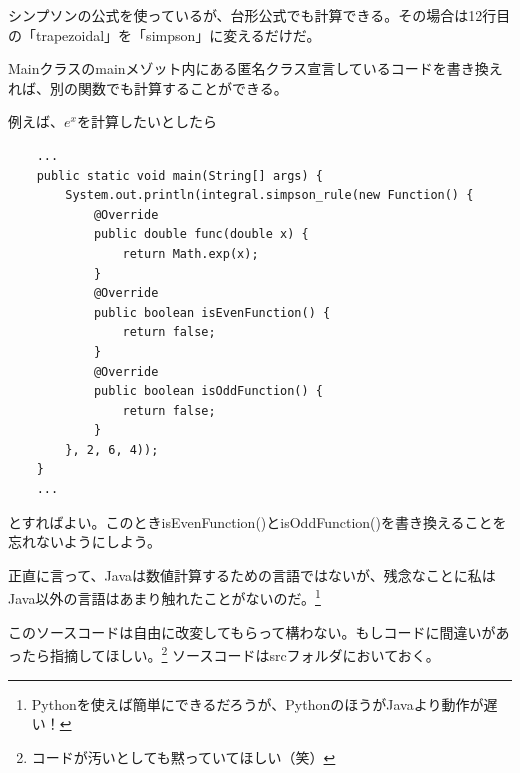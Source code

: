 \documentclass[a4j,dvipdfmx]{jsarticle}
\begin{document}
シンプソンの公式を使っているが、台形公式でも計算できる。その場合は12行目の「trapezoidal」を「simpson」に変えるだけだ。
\newpage

Mainクラスのmainメゾット内にある匿名クラス宣言しているコードを書き換えれば、別の関数でも計算することができる。

例えば、$e^x$を計算したいとしたら

\begin{lstlisting}
    ...
    public static void main(String[] args) {
        System.out.println(integral.simpson_rule(new Function() {
            @Override
            public double func(double x) {
                return Math.exp(x);
            }   
            @Override
            public boolean isEvenFunction() {
                return false;
            }
            @Override
            public boolean isOddFunction() {
                return false;
            }
        }, 2, 6, 4));
    }
    ...
\end{lstlisting}
とすればよい。このときisEvenFunction()とisOddFunction()を書き換えることを忘れないようにしよう。

正直に言って、Javaは数値計算するための言語ではないが、残念なことに私はJava以外の言語はあまり触れたことがないのだ。\footnote{Pythonを使えば簡単にできるだろうが、PythonのほうがJavaより動作が遅い！}

このソースコードは自由に改変してもらって構わない。もしコードに間違いがあったら指摘してほしい。\footnote{コードが汚いとしても黙っていてほしい（笑）}
ソースコードはsrcフォルダにおいておく。
\end{document}
